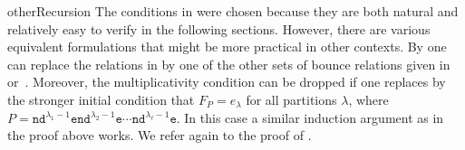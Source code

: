 \documentclass[reqno]{amsart}
\newcommand{\myi}[1]{\item\label{Item:#1}}
\newcommand{\setN}{\mathbb{N}}
\newcommand{\setQ}{\mathbb{Q}}
\newcommand{\setZ}{\mathbb{Z}}
\newcommand{\xvec}{\mathbf{x}}
\newcommand{\xqvar}{}%
\newcommand{\estep}{\texttt{e}}
\newcommand{\dstep}{\texttt{d}}
\newcommand{\nstep}{\texttt{n}}
\newcommand{\bs}{{\kern-.08em\texttt{.}\kern-.13em}} %
\newcommand{\field}{\setQ(q)}
\newcommand{\elementaryE}{\mathrm{e}}
\newcommand{\SCH}[1]{\mathcal{S}_{#1}}     %
\begin{document}
\begin{rem}{otherRecursion}
The conditions in  were chosen because they are both natural and relatively easy to verify in the following sections.
However, there are various equivalent formulations that might be more practical in other contexts.
By  one can replace the relations in  by one of the other sets of bounce relations given in  or~.
Moreover, the multiplicativity condition  can be dropped if one replaces  by the stronger initial condition that $F_P=e_{\lambda}$ for all partitions $\lambda$, where $P=\nstep\dstep^{\lambda_1-1}\estep\nstep\dstep^{\lambda_{2}-1}\estep\cdots\nstep\dstep^{\lambda_{\ell}-1}\estep$.
In this case a similar induction argument as in the proof above works.
We refer again to the proof of \cite[Thm.~5.4]{DAdderio2020}.
\end{rem}




\end{document}
